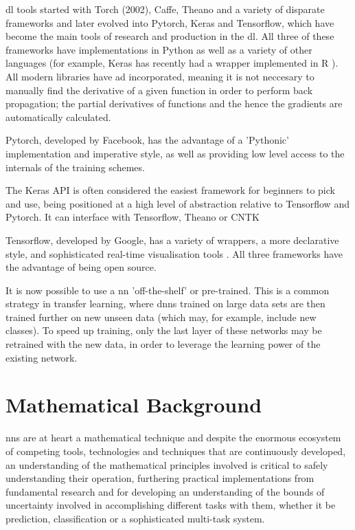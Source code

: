 \gls{dl} tools started with Torch (2002), Caffe, Theano and a variety of disparate frameworks and later evolved into Pytorch, Keras and Tensorflow, which have become the main tools of research and production in the \gls{dl}. All three of these frameworks have implementations in Python as well as a variety of other languages (for example, Keras has recently had a wrapper implemented in R \cite{keras_r}). All modern libraries have \gls{ad} incorporated, meaning it is not neccesary to manually find the derivative of a given function in order to perform back propagation; the partial derivatives of functions and the hence the gradients are automatically calculated.  \bigskip

Pytorch, developed by Facebook, has the advantage of a 'Pythonic' implementation and imperative style, as well as providing low level access to the internals of the training schemes.
\bigskip

The Keras API is often considered the easiest framework for beginners to pick and use, being positioned at a high level of abstraction relative to Tensorflow and Pytorch. It can interface with Tensorflow, Theano or CNTK  
\bigskip

Tensorflow, developed by Google, has a variety of wrappers, a more declarative style, and sophisticated real-time visualisation tools \cite{tale_dl}. All three frameworks have the advantage of being open source. 
\bigskip

It is now possible to use a  \gls{nn} 'off-the-shelf' or pre-trained. This is a common strategy in transfer learning, where \gls{dnn}s trained on large data sets are then trained further on new unseen data (which may, for example, include new classes). To speed up training, only the last layer of these networks may be retrained with the new data, in order to leverage the learning power of the existing network. 
\bigskip

\section*{Mathematical Background}


\gls{nn}s are at heart a mathematical technique and despite the enormous ecosystem of competing tools, technologies and techniques that are continuously developed, an understanding of the mathematical principles involved  is critical to safely understanding their operation, furthering practical implementations from fundamental research and for developing an understanding of the bounds of uncertainty involved in accomplishing different tasks with them, whether it be prediction, classification or a sophisticated multi-task system.

